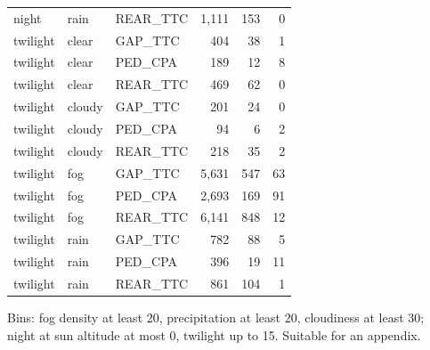 \begin{table}[htbp]
\begin{tabular}{@{}lllrrr@{}}
night & rain & REAR\_TTC & 1,111 & 153 & 0 \\
twilight & clear & GAP\_TTC & 404 & 38 & 1 \\
twilight & clear & PED\_CPA & 189 & 12 & 8 \\
twilight & clear & REAR\_TTC & 469 & 62 & 0 \\
twilight & cloudy & GAP\_TTC & 201 & 24 & 0 \\
twilight & cloudy & PED\_CPA & 94 & 6 & 2 \\
twilight & cloudy & REAR\_TTC & 218 & 35 & 2 \\
twilight & fog & GAP\_TTC & 5,631 & 547 & 63 \\
twilight & fog & PED\_CPA & 2,693 & 169 & 91 \\
twilight & fog & REAR\_TTC & 6,141 & 848 & 12 \\
twilight & rain & GAP\_TTC & 782 & 88 & 5 \\
twilight & rain & PED\_CPA & 396 & 19 & 11 \\
twilight & rain & REAR\_TTC & 861 & 104 & 1 \\
\bottomrule
\end{tabular}
\par\smallskip\footnotesize\raggedright Bins: fog density at least 20, precipitation at least 20, cloudiness at least 30; night at sun altitude at most 0\textdegree, twilight up to 15\textdegree. Suitable for an appendix.
\end{table}
